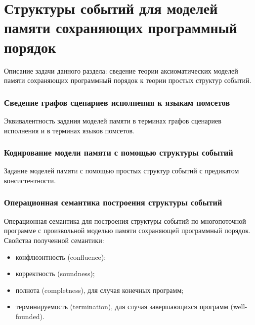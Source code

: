 \chapter{Структуры событий для моделей памяти сохраняющих программный порядок}
\label{ch:porf-evenstruct}

Описание задачи данного раздела:
сведение теории аксиоматических моделей памяти
сохраняющих программный порядок к теории простых структур событий.

\subsection{Сведение графов сценариев исполнения к языкам помсетов}

Эквивалентность задания моделей памяти в терминах
графов сценариев исполнения и в терминах языков помсетов.

\subsection{Кодирование модели памяти с помощью структуры событий}

Задание моделей памяти с помощью простых структур событий
с предикатом консистентности. 

\subsection{Операционная семантика построения структуры событий}

Операционная семантика для построения структуры событий
по многопоточной программе с произвольной моделью памяти
сохраняющей программный порядок.
Свойства полученной семантики:

\begin{itemize}
  \item конфлюэнтность (confluence);
  \item корректность (soundness);
  \item полнота (completness),
    для случая конечных программ;
  \item терминируемость (termination),
    для случая завершающихся программ (well-founded).
\end{itemize}
